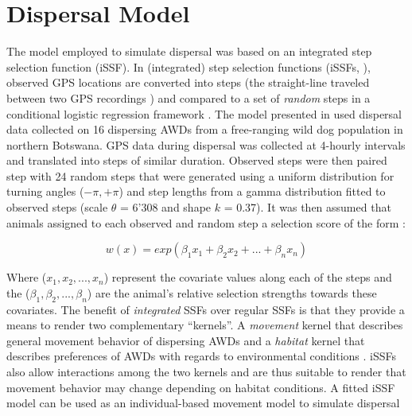 \documentclass[abstract=on,10pt,a4paper,bibliography=totocnumbered]{article}
\begin{document}
\section{Dispersal Model}
The model employed to simulate dispersal was based on an integrated step
selection function (iSSF). In (integrated) step selection functions (iSSFs,
\citealp{Fortin.2005, Avgar.2016}), observed GPS locations are converted into
steps (the straight-line traveled between two GPS recordings
\citep{Turchin.1998}) and compared to a set of \textit{random} steps in a
conditional logistic regression framework \citep{Fortin.2005, Thurfjell.2014,
Muff.2020, Fieberg.2021}. The model presented in \citep{Hofmann.2023} used
dispersal data collected on 16 dispersing AWDs from a free-ranging wild dog
population in northern Botswana. GPS data during dispersal was collected at
4-hourly intervals and translated into steps of similar duration. Observed steps
were then paired step with 24 random steps that were generated using a uniform
distribution for turning angles (\(-\pi, +\pi\)) and step lengths from a gamma
distribution fitted to observed steps (scale \(\theta\) = 6'308 and shape \(k\)
= 0.37). It was then assumed that animals assigned to each observed and random
step a selection score of the form \citep{Fortin.2005}:

\begin{equation}
\label{EQ1}
  w(x) = exp(\beta_1 x_1 + \beta_2 x_2 + ... + \beta_n x_n)
\end{equation}

Where (\(x_1, x_2, ..., x_n\)) represent the covariate values along each of the
steps and the (\(\beta_1, \beta_2, ..., \beta_n\)) are the animal's relative
selection strengths \citealp{Avgar.2017} towards these covariates. The benefit
of \textit{integrated} SSFs over regular SSFs is that they provide a means to
render two complementary ``kernels''. A \textit{movement} kernel that describes
general movement behavior of dispersing AWDs and a \textit{habitat} kernel that
describes preferences of AWDs with regards to environmental conditions
\citep{Fieberg.2021}. iSSFs also allow interactions among the two kernels and
are thus suitable to render that movement behavior may change depending on
habitat conditions. A fitted iSSF model can be used as an individual-based
movement model to simulate dispersal \citep{Signer.2017, Hofmann.2023}

\newpage
\end{document}
